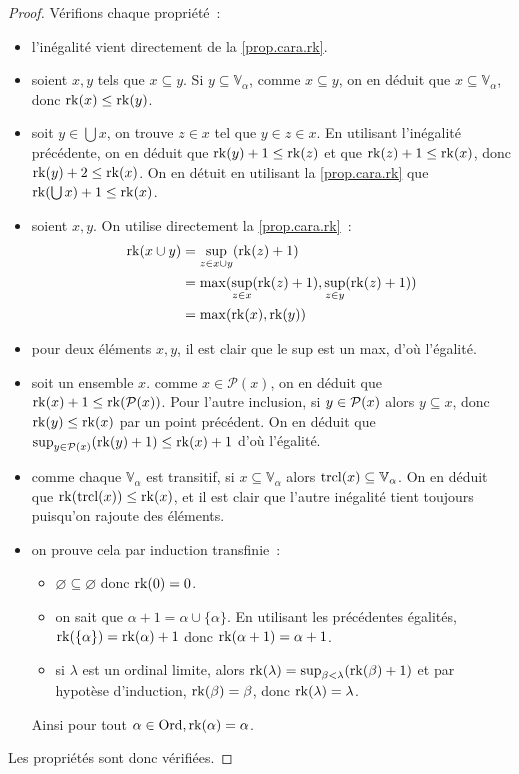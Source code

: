 \begin{proof}
  Vérifions chaque propriété~:
  \begin{itemize}
  \item l'inégalité vient directement de la \cref{prop.cara.rk}.
  \item soient $x,y$ tels que $x\subseteq y$. Si $y\subseteq\mathbb V_\alpha$,
    comme $x\subseteq y$, on en déduit que $x\subseteq\mathbb V_\alpha$, donc
    $\operatorname{rk}(x)\leq \operatorname{rk}(y)$.
  \item soit $y\in \bigcup x$, on trouve $z\in x$ tel que $y\in z \in x$. En
    utilisant l'inégalité précédente, on en déduit que $\operatorname{rk}(y) + 1 \leq \operatorname{rk}(z)$
    et que $\operatorname{rk}(z) + 1 \leq \operatorname{rk}(x)$, donc $\operatorname{rk}(y) + 2 \leq \operatorname{rk}(x)$. On en détuit
    en utilisant la \cref{prop.cara.rk} que $\operatorname{rk}(\bigcup x) + 1 \leq \operatorname{rk}(x)$.
  \item soient $x,y$. On utilise directement la \cref{prop.cara.rk}~:
    \begin{align*}
      \operatorname{rk}(x\cup y) &= \sup_{z \in x \cup y} (\operatorname{rk}(z) + 1)\\
      &= \max(\sup_{z \in x} (\operatorname{rk}(z) + 1), \sup_{z\in y} (\operatorname{rk}(z) + 1))\\
      &= \max(\operatorname{rk}(x),\operatorname{rk}(y))
    \end{align*}
  \item pour deux éléments $x,y$, il est clair que le sup est un max, d'où
    l'égalité.
  \item soit un ensemble $x$. comme $x\in \mathcal P(x)$, on en déduit que
    $\operatorname{rk}(x) + 1 \leq \operatorname{rk} (\mathcal{P} (x))$. Pour l'autre inclusion, si
    $y\in \mathcal{P}(x)$ alors $y\subseteq x$, donc
    $\operatorname{rk}(y) \leq \operatorname{rk}(x)$ par un point précédent. On en déduit que
    $\sup_{y\in \mathcal{P}(x)} (\operatorname{rk}(y) + 1) \leq \operatorname{rk}(x) + 1$ d'où
    l'égalité.
  \item comme chaque $\mathbb V_\alpha$ est transitif, si
    $x\subseteq \mathbb V_\alpha$ alors $\operatorname{trcl}(x)\subseteq \mathbb V_\alpha$. On
    en déduit que $\operatorname{rk}(\operatorname{trcl}(x)) \leq \operatorname{rk}(x)$, et il est clair que l'autre
    inégalité tient toujours puisqu'on rajoute des éléments.
  \item on prouve cela par induction transfinie~:
    \begin{itemize}
    \item $\varnothing \subseteq \varnothing$ donc $\operatorname{rk}(0) = 0$.
    \item on sait que $\alpha + 1 = \alpha \cup \{\alpha\}$. En utilisant les
      précédentes égalités, $\operatorname{rk}(\{\alpha\}) = \operatorname{rk}(\alpha) + 1$ donc
      $\operatorname{rk}(\alpha + 1) = \alpha + 1$.
    \item si $\lambda$ est un ordinal limite, alors
      $\operatorname{rk}(\lambda) = \sup_{\beta < \lambda} (\operatorname{rk}(\beta) + 1)$ et par hypotèse
      d'induction, $\operatorname{rk}(\beta) = \beta$, donc $\operatorname{rk}(\lambda) = \lambda$.
    \end{itemize}
    Ainsi pour tout $\alpha \in \operatorname{Ord}, \operatorname{rk}(\alpha) = \alpha$.
  \end{itemize}
  Les propriétés sont donc vérifiées.
\end{proof}

